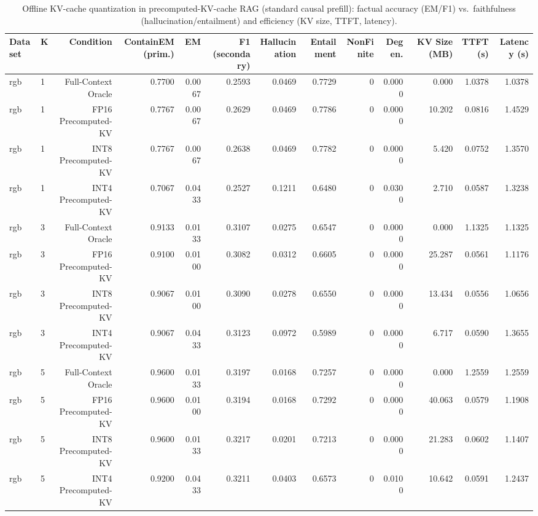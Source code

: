 \begin{table}[t]
\centering
\small
\begin{tabular}{llrrrrrrrrrrr}
\toprule
Dataset & K & Condition & ContainEM (prim.) & EM & F1 (secondary) & Hallucination & Entailment & NonFinite & Degen. & KV Size (MB) & TTFT (s) & Latency (s) \\
\midrule
rgb & 1 & Full-Context Oracle & 0.7700 & 0.0067 & 0.2593 & 0.0469 & 0.7729 & 0 & 0.0000 & 0.000 & 1.0378 & 1.0378 \\
rgb & 1 & FP16 Precomputed-KV & 0.7767 & 0.0067 & 0.2629 & 0.0469 & 0.7786 & 0 & 0.0000 & 10.202 & 0.0816 & 1.4529 \\
rgb & 1 & INT8 Precomputed-KV & 0.7767 & 0.0067 & 0.2638 & 0.0469 & 0.7782 & 0 & 0.0000 & 5.420 & 0.0752 & 1.3570 \\
rgb & 1 & INT4 Precomputed-KV & 0.7067 & 0.0433 & 0.2527 & 0.1211 & 0.6480 & 0 & 0.0300 & 2.710 & 0.0587 & 1.3238 \\
rgb & 3 & Full-Context Oracle & 0.9133 & 0.0133 & 0.3107 & 0.0275 & 0.6547 & 0 & 0.0000 & 0.000 & 1.1325 & 1.1325 \\
rgb & 3 & FP16 Precomputed-KV & 0.9100 & 0.0100 & 0.3082 & 0.0312 & 0.6605 & 0 & 0.0000 & 25.287 & 0.0561 & 1.1176 \\
rgb & 3 & INT8 Precomputed-KV & 0.9067 & 0.0100 & 0.3090 & 0.0278 & 0.6550 & 0 & 0.0000 & 13.434 & 0.0556 & 1.0656 \\
rgb & 3 & INT4 Precomputed-KV & 0.9067 & 0.0433 & 0.3123 & 0.0972 & 0.5989 & 0 & 0.0000 & 6.717 & 0.0590 & 1.3655 \\
rgb & 5 & Full-Context Oracle & 0.9600 & 0.0133 & 0.3197 & 0.0168 & 0.7257 & 0 & 0.0000 & 0.000 & 1.2559 & 1.2559 \\
rgb & 5 & FP16 Precomputed-KV & 0.9600 & 0.0100 & 0.3194 & 0.0168 & 0.7292 & 0 & 0.0000 & 40.063 & 0.0579 & 1.1908 \\
rgb & 5 & INT8 Precomputed-KV & 0.9600 & 0.0133 & 0.3217 & 0.0201 & 0.7213 & 0 & 0.0000 & 21.283 & 0.0602 & 1.1407 \\
rgb & 5 & INT4 Precomputed-KV & 0.9200 & 0.0433 & 0.3211 & 0.0403 & 0.6573 & 0 & 0.0100 & 10.642 & 0.0591 & 1.2437 \\
\bottomrule
\end{tabular}
\caption{Offline KV-cache quantization in precomputed-KV-cache RAG (standard causal prefill): factual accuracy (EM/F1) vs.\ faithfulness (hallucination/entailment) and efficiency (KV size, TTFT, latency).}
\label{tab:main}
\end{table}
